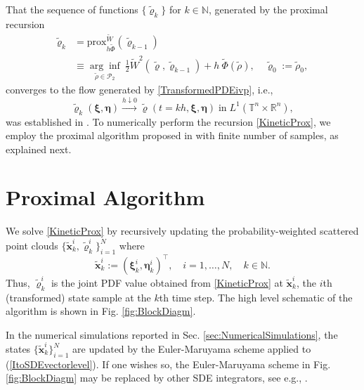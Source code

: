 \documentclass[10pt,twocolumn]{IEEEtran}
\begin{document}
That the sequence of functions $\{\tilde{\varrho}_{k}\}$ for $k\in\mathbb{N}$, generated by the proximal recursion
\begin{align}
\tilde{\varrho}_{k} &= {\text{prox}}^{\widetilde{W}}_{h\widetilde{\Phi}}(\tilde{\varrho}_{k-1}) \nonumber\\
&\equiv \underset{\tilde{\rho}\in\mathcal{P}_{2}}{\arg\inf}\:\frac{1}{2}\widetilde{W}^{2}\left(\tilde{\varrho},\tilde{\varrho}_{k-1}\right) + h\:\widetilde{\Phi}(\tilde{\rho}), \quad \tilde{\varrho}_{0} := \tilde{\rho}_{0},
\label{KineticProx}	
\end{align}
converges to the flow generated by \eqref{TransformedPDEivp}, i.e., 
$$\tilde{\varrho}_{k}(\bm{\xi},\bm{\eta}) \xrightarrow{h\downarrow 0} \tilde{\varrho}(t=kh,\bm{\xi},\bm{\eta})\;\text{in}\;L^{1}\left(\mathbb{T}^{n}\times\mathbb{R}^{n}\right),$$
was established in \cite{duong2014conservative}. To numerically perform the recursion \eqref{KineticProx}, we employ the proximal algorithm proposed in \cite{caluya2019TAC} with finite number of samples, as explained next.







\section{Proximal Algorithm}\label{sec:ProxAlgo}
We solve \eqref{KineticProx} by recursively updating the probability-weighted scattered point clouds $\{\tilde{\bm{x}}_{k}^{i},\tilde{\varrho}_{k}^{i}\}_{i=1}^{N}$ where 
$$\tilde{\bm{x}}_{k}^{i}:=\left(\bm{\xi}_{k}^{i},\bm{\eta}_{k}^{i}\right)^{\!\top}, \quad i=1,\hdots,N, \quad k\in\mathbb{N}.$$
Thus, $\tilde{\varrho}_{k}^{i}$ is the joint PDF value obtained from \eqref{KineticProx} at $\tilde{\bm{x}}_{k}^{i}$, the $i$th (transformed) state sample at the $k$th time step. The high level schematic of the algorithm is shown in Fig. \ref{fig:BlockDiagm}. 

In the numerical simulations reported in Sec. \ref{sec:NumericalSimulations}, the states $\{\tilde{\bm{x}}_{k}^{i}\}_{i=1}^{N}$ are updated by the Euler-Maruyama scheme applied to (\ref{ItoSDEvectorlevel}). If one wishes so, the Euler-Maruyama scheme in Fig. \ref{fig:BlockDiagm} may be replaced by other SDE integrators, see e.g., \cite[Sec. III.B.2, Remark 1]{caluya2019TAC}. 
\end{document}
